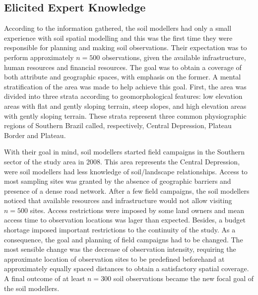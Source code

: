 \subsection{Elicited Expert Knowledge}

According to the information gathered, the soil modellers had only a small experience with soil spatial 
modelling and this was the first time they were responsible for planning and making soil observations. Their 
expectation was to perform approximately $n = 500$ observations, given the available infrastructure, human 
resources and financial resources. The goal was to obtain a  coverage of both attribute and 
geographic spaces, with emphasis on the former. A mental stratification of the area was made to help achieve 
this goal. First, the area was divided into three strata according to geomorphological features: low elevation 
areas with flat and gently sloping terrain, steep slopes, and high elevation areas with gently sloping 
terrain. These strata represent three common physiographic regions of Southern Brazil called, respectively, 
Central Depression, Plateau Border and Plateau.

With their goal in mind, soil modellers started field campaigns in the Southern sector of the study area in 
\num{2008}. This area represents the Central Depression, were soil modellers had less knowledge of 
soil\-/landscape relationships. Access to most sampling sites was granted by the absence of geographic 
barriers and presence of a dense road network. After a few field campaigns, the soil modellers noticed that 
available resources and infrastructure would not allow visiting $n = 500$ sites. Access restrictions were 
imposed by some land owners and mean access time to observation locations was lager than expected. Besides, a 
budget shortage imposed important restrictions to the continuity of the study. As a consequence, the goal and 
planning of field campaigns had to be changed. The most sensible change was the decrease of observation 
intensity, requiring the approximate location of observation sites to be predefined beforehand at 
approximately equally spaced distances to obtain a satisfactory spatial coverage. A final outcome of at least 
$n = 300$ soil observations became the new focal goal of the soil modellers.

